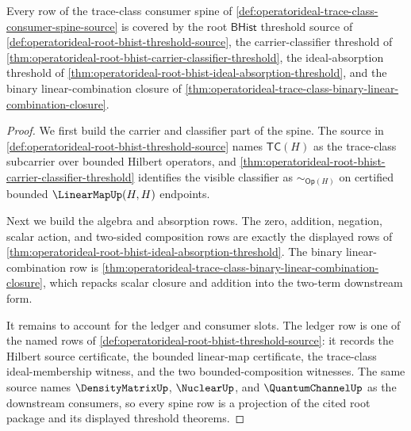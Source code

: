 \begin{theorem}
\label{thm:operatorideal-trace-class-consumer-spine-coverage}
Every row of the trace-class consumer spine of \autoref{def:operatorideal-trace-class-consumer-spine-source} is covered by the root $\mathsf{BHist}$ threshold source of \autoref{def:operatorideal-root-bhist-threshold-source}, the carrier-classifier threshold of \autoref{thm:operatorideal-root-bhist-carrier-classifier-threshold}, the ideal-absorption threshold of \autoref{thm:operatorideal-root-bhist-ideal-absorption-threshold}, and the binary linear-combination closure of \autoref{thm:operatorideal-trace-class-binary-linear-combination-closure}.
\end{theorem}
\begin{proof}
We first build the carrier and classifier part of the spine. The source in \autoref{def:operatorideal-root-bhist-threshold-source} names $\mathsf{TC}(H)$ as the trace-class subcarrier over bounded Hilbert operators, and \autoref{thm:operatorideal-root-bhist-carrier-classifier-threshold} identifies the visible classifier as $\sim_{\mathsf{Op}(H)}$ on certified bounded $\LinearMapUp(H,H)$ endpoints.

Next we build the algebra and absorption rows. The zero, addition, negation, scalar action, and two-sided composition rows are exactly the displayed rows of \autoref{thm:operatorideal-root-bhist-ideal-absorption-threshold}. The binary linear-combination row is \autoref{thm:operatorideal-trace-class-binary-linear-combination-closure}, which repacks scalar closure and addition into the two-term downstream form.

It remains to account for the ledger and consumer slots. The ledger row is one of the named rows of \autoref{def:operatorideal-root-bhist-threshold-source}: it records the Hilbert source certificate, the bounded linear-map certificate, the trace-class ideal-membership witness, and the two bounded-composition witnesses. The same source names $\DensityMatrixUp$, $\NuclearUp$, and $\QuantumChannelUp$ as the downstream consumers, so every spine row is a projection of the cited root package and its displayed threshold theorems.
\end{proof}

